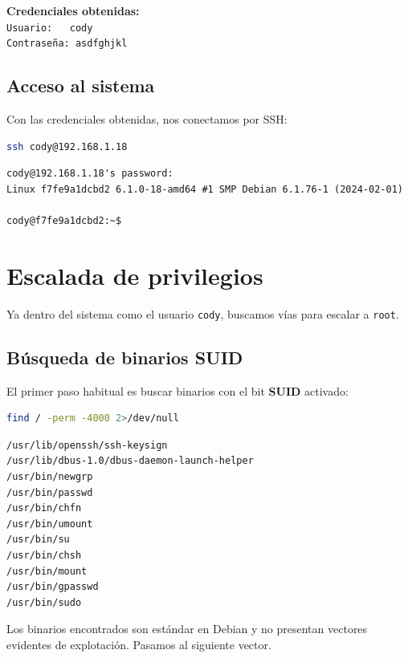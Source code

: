 \documentclass[12pt,a4paper]{article}
\begin{document}
\begin{flagbox}
  \textbf{Credenciales obtenidas:}\\[4pt]
  \texttt{Usuario:\ \ \ cody}\\
  \texttt{Contraseña: asdfghjkl}
\end{flagbox}

\subsection{Acceso al sistema}

Con las credenciales obtenidas, nos conectamos por SSH:

\begin{lstlisting}[language=bash]
ssh cody@192.168.1.18
\end{lstlisting}

\begin{lstlisting}[style=output]
cody@192.168.1.18's password:
Linux f7fe9a1dcbd2 6.1.0-18-amd64 #1 SMP Debian 6.1.76-1 (2024-02-01)

cody@f7fe9a1dcbd2:~$
\end{lstlisting}

\section{Escalada de privilegios}

Ya dentro del sistema como el usuario \texttt{cody}, buscamos vías para escalar a \texttt{root}.

\subsection{Búsqueda de binarios SUID}

El primer paso habitual es buscar binarios con el bit \textbf{SUID} activado:

\begin{lstlisting}[language=bash]
find / -perm -4000 2>/dev/null
\end{lstlisting}

\begin{lstlisting}[style=output]
/usr/lib/openssh/ssh-keysign
/usr/lib/dbus-1.0/dbus-daemon-launch-helper
/usr/bin/newgrp
/usr/bin/passwd
/usr/bin/chfn
/usr/bin/umount
/usr/bin/su
/usr/bin/chsh
/usr/bin/mount
/usr/bin/gpasswd
/usr/bin/sudo
\end{lstlisting}

Los binarios encontrados son estándar en Debian y no presentan vectores evidentes de explotación. Pasamos al siguiente vector.
\end{document}
